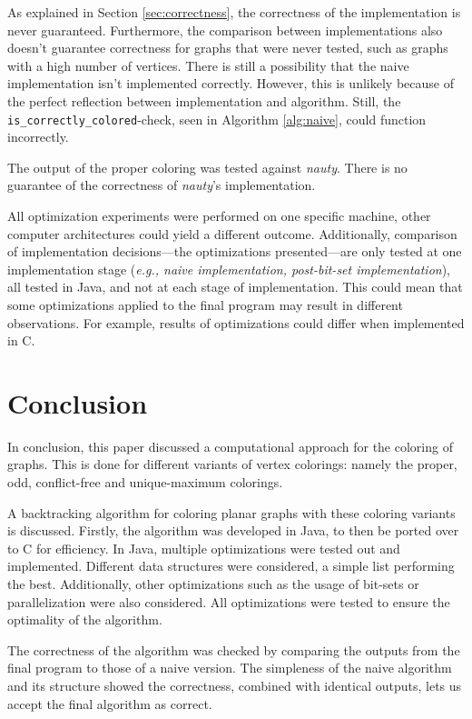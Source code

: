 \documentclass{article}
\begin{document}
As explained in Section \ref{sec:correctness}, the correctness of the implementation is never guaranteed. Furthermore, the comparison between implementations also doesn't guarantee correctness for graphs that were never tested, such as graphs with a high number of vertices. 
There is still a possibility that the naive implementation isn't implemented correctly. However, this is unlikely because of the perfect reflection between implementation and algorithm. Still, the \texttt{is\_correctly\_colored}-check, seen in Algorithm \ref{alg:naive}, could function incorrectly.

The output of the proper coloring was tested against \textit{nauty}. There is no guarantee of the correctness of \textit{nauty}'s implementation.

All optimization experiments were performed on one specific machine, other computer architectures could yield a different outcome. 
Additionally, comparison of implementation decisions---the optimizations presented---are only tested at one implementation stage (\textit{e.g., naive implementation, post-bit-set implementation}), all tested in Java, and not at each stage of implementation. This could mean that some optimizations applied to the final program may result in different observations. For example, results of optimizations could differ when implemented in C.

\section{Conclusion}
\label{sec:conclusion}

In conclusion, this paper discussed a computational approach for the coloring of graphs. This is done for different variants of vertex colorings: namely the proper, odd, conflict-free and unique-maximum colorings. 

A backtracking algorithm for coloring planar graphs with these coloring variants is discussed. Firstly, the algorithm was developed in Java, to then be ported over to C for efficiency. In Java, multiple optimizations were tested out and implemented. Different data structures were considered, a simple list performing the best. Additionally, other optimizations such as the usage of bit-sets or parallelization were also considered. 
All optimizations were tested to ensure the optimality of the algorithm.

The correctness of the algorithm was checked by comparing the outputs from the final program to those of a naive version. The simpleness of the naive algorithm and its structure showed the correctness, combined with identical outputs, lets us accept the final algorithm as correct.
\end{document}
